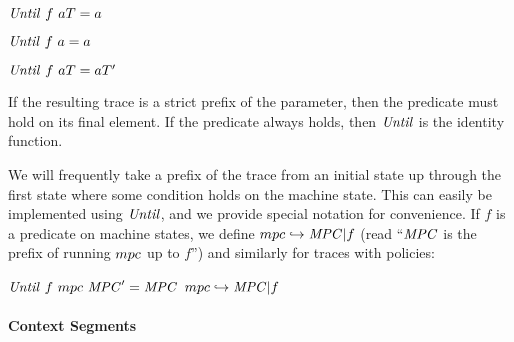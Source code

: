 \documentclass[acmsmall,review,anonymous]{acmart}\settopmatter{printfolios=true,printccs=false,printacmref=false}
\begin{document}
\begin{center}
  \begin{minipage}{.3\textwidth}
             {\(\mathit{Until} ~ f ~ aT = a\)}
  \end{minipage}
%
  \begin{minipage}{.3\textwidth}
    \judgment{}
             {\(\mathit{Until} ~ f ~ a = a\)}
%
  \end{minipage}
  \begin{minipage}{.3\textwidth}
                {\(\mathit{Until} ~ f ~ aT = aT'\)}
  \end{minipage}
\end{center}
%
If the resulting trace is a strict prefix of the parameter, then the
predicate must hold on its final element. If the predicate always holds, then
\(\mathit{Until}\) is the identity function.



We will frequently take a prefix of the trace from an initial state up
through the first state where some condition holds on the machine state.
This can easily be implemented using \(\mathit{Until}\), and we provide special notation
for convenience.
%
If \(f\) is a predicate on machine states, we define \(mpc
\hookrightarrow \mathit{MPC} | f\) (read ``\(\mathit{MPC}\) is the prefix of
running \(mpc\) up to \(f\)'') and similarly for traces with policies:

\begin{center}
            {\(\mathit{Until} ~ f ~ mpc ~ \mathit{MPC}' = \mathit{MPC}\)}
            {\(mpc \hookrightarrow \mathit{MPC} | f\)}
\end{center}

\paragraph*{Context Segments}
\end{document}
